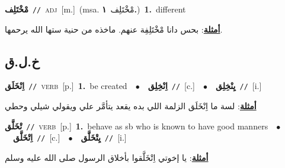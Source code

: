 \documentclass[10pt,a4paper,twoside]{article} %
\begin{document}
\begin{multicols}{2}
{\setlength\topsep{0pt}\textbf{\foreignlanguage{arabic}{مْخْتَلِف}}\ {\color{gray}\texttt{//}\color{black}}\ \textsc{adj}\ [m.]\ \color{gray}(msa. \foreignlanguage{arabic}{مْخْتَلِف}~\foreignlanguage{arabic}{\textbf{١.}})\color{black}\ \textbf{1.}~different\  \begin{flushright}\color{gray}\foreignlanguage{arabic}{\textbf{\underline{\foreignlanguage{arabic}{أمثلة}}}: بحس دانا مْخْتَلِفِة عنهم. ماخذه من حنية ستها الله يرحمها.}\end{flushright}\color{black}} \vspace{2mm}

\vspace{-3mm}
\subsection*{\color{blue}\foreignlanguage{arabic}{خ.ل.ق}\color{blue}{}} 

{\setlength\topsep{0pt}\textbf{\foreignlanguage{arabic}{اِنْخَلَق}}\ {\color{gray}\texttt{//}\color{black}}\ \textsc{verb}\ [p.]\ \textbf{1.}~be created\ \ $\bullet$\ \ \setlength\topsep{0pt}\textbf{\foreignlanguage{arabic}{اِنْخِلِق}}\ {\color{gray}\texttt{//}\color{black}}\ [c.]\ \ $\bullet$\ \ \setlength\topsep{0pt}\textbf{\foreignlanguage{arabic}{يِنْخِلِق}}\ {\color{gray}\texttt{//}\color{black}}\ [i.]\  \begin{flushright}\color{gray}\foreignlanguage{arabic}{\textbf{\underline{\foreignlanguage{arabic}{أمثلة}}}: لسة ما اِنْخَلَق الزلمة اللي بده يقعد يتأمَّر علي ويقولي شيلي وحطي}\end{flushright}\color{black}} \vspace{2mm}

{\setlength\topsep{0pt}\textbf{\foreignlanguage{arabic}{تْخَلَّق}}\ {\color{gray}\texttt{//}\color{black}}\ \textsc{verb}\ [p.]\ \textbf{1.}~behave as sb who is known to have good manners\ \ $\bullet$\ \ \setlength\topsep{0pt}\textbf{\foreignlanguage{arabic}{اِتْخَلَّق}}\ {\color{gray}\texttt{//}\color{black}}\ [c.]\ \ $\bullet$\ \ \setlength\topsep{0pt}\textbf{\foreignlanguage{arabic}{يِتْخَلَّق}}\ {\color{gray}\texttt{//}\color{black}}\ [i.]\  \begin{flushright}\color{gray}\foreignlanguage{arabic}{\textbf{\underline{\foreignlanguage{arabic}{أمثلة}}}: يا إخوتي اِتْخَلَّقوا بأخلاق الرسول صلى الله عليه وسلم}\end{flushright}\color{black}} \vspace{2mm}


\end{multicols}
\end{document}
